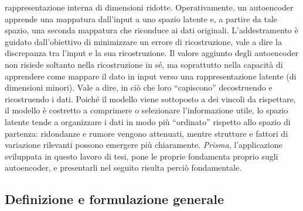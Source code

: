 rappresentazione interna di dimensioni ridotte. Operativamente, un autoencoder apprende una mappatura
dall'input a uno spazio latente e, a partire da tale spazio, una seconda
mappatura che 
riconduce ai dati originali. L'addestramento è guidato
dall'obiettivo di minimizzare un errore di ricostruzione, 
vale a dire la
discrepanza tra l'input e la sua ricostruzione. 
Il valore aggiunto degli autoencoder non risiede soltanto nella ricostruzione in sé,
ma soprattutto nella capacità di apprendere come mappare il dato in input verso una rappresentazione latente (di dimensioni minori).
Vale a dire,
in ciò che loro ``capiscono'' decostruendo e ricostruendo i dati. Poiché il
modello viene sottoposto a dei vincoli da rispettare,
il modello è costretto a comprimere o
selezionare l'informazione utile, lo spazio latente tende a organizzare i dati
in modo più ``ordinato'' rispetto allo spazio di partenza: ridondanze e rumore
vengono attenuati, mentre strutture e fattori di variazione rilevanti possono
emergere più chiaramente. 
\textit{Prisma}, l'applicazione
sviluppata in questo lavoro di tesi, pone le proprie fondamenta proprio sugli autoencoder, e
presentarli nel seguito risulta perciò fondamentale.
\subsection{Definizione e formulazione generale}
\label{subsec:ae_definition}

